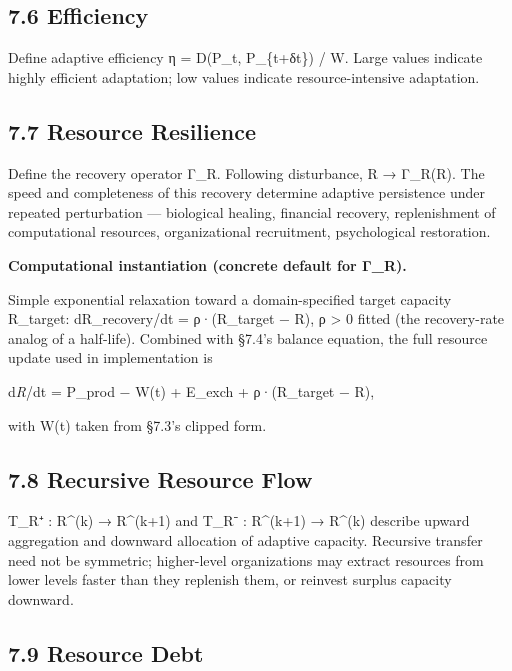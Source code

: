 \documentclass[
]{article}
\begin{document}
\hypertarget{efficiency}{%
\subsection{7.6 Efficiency}\label{efficiency}}

Define adaptive efficiency η = D(P\_t, P\_\{t+δt\}) / W. Large values
indicate highly efficient adaptation; low values indicate
resource-intensive adaptation.

\hypertarget{resource-resilience}{%
\subsection{7.7 Resource Resilience}\label{resource-resilience}}

Define the recovery operator Γ\_R. Following disturbance, R → Γ\_R(R).
The speed and completeness of this recovery determine adaptive
persistence under repeated perturbation --- biological healing,
financial recovery, replenishment of computational resources,
organizational recruitment, psychological restoration.

\textbf{Computational instantiation (concrete default for Γ\_R).}

Simple exponential relaxation toward a domain-specified target capacity
R\_target: dR\_recovery/dt = ρ·(R\_target − R), ρ \textgreater{} 0
fitted (the recovery-rate analog of a half-life). Combined with §7.4's
balance equation, the full resource update used in implementation is

d\emph{R}/dt = P\_prod − W(t) + E\_exch + ρ·(R\_target − R),

with W(t) taken from §7.3's clipped form.

\hypertarget{recursive-resource-flow}{%
\subsection{7.8 Recursive Resource Flow}\label{recursive-resource-flow}}

T\_R⁺ : R\^{}(k) → R\^{}(k+1) and T\_R⁻ : R\^{}(k+1) → R\^{}(k) describe
upward aggregation and downward allocation of adaptive capacity.
Recursive transfer need not be symmetric; higher-level organizations may
extract resources from lower levels faster than they replenish them, or
reinvest surplus capacity downward.

\hypertarget{resource-debt}{%
\subsection{7.9 Resource Debt}\label{resource-debt}}
\end{document}
